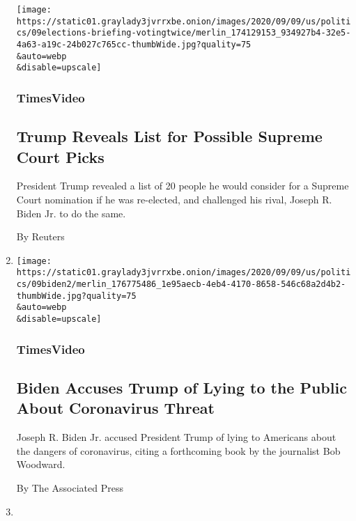 \begin{enumerate}
  \texttt{[image: https://static01.graylady3jvrrxbe.onion/images/2020/09/09/us/politics/09elections-briefing-votingtwice/merlin\_174129153\_934927b4-32e5-4a63-a19c-24b027c765cc-thumbWide.jpg?quality=75\\\&auto=webp\\\&disable=upscale]}

  \hypertarget{timesvideo}{%
  \subsubsection{TimesVideo}\label{timesvideo}}

  \hypertarget{trump-reveals-list-for-possible-supreme-court-picks}{%
  \subsection{Trump Reveals List for Possible Supreme Court
  Picks}\label{trump-reveals-list-for-possible-supreme-court-picks}}

  President Trump revealed a list of 20 people he would consider for a
  Supreme Court nomination if he was re-elected, and challenged his
  rival, Joseph R. Biden Jr. to do the same.

  By Reuters
\item
  \href{/video/us/politics/100000007331572/biden-trump-woodward-covid-michigan.html}{}

  \texttt{[image: https://static01.graylady3jvrrxbe.onion/images/2020/09/09/us/politics/09biden2/merlin\_176775486\_1e95aecb-4eb4-4170-8658-546c68a2d4b2-thumbWide.jpg?quality=75\\\&auto=webp\\\&disable=upscale]}

  \hypertarget{timesvideo-1}{%
  \subsubsection{TimesVideo}\label{timesvideo-1}}

  \hypertarget{biden-accuses-trump-of-lying-to-the-public-about-coronavirus-threat}{%
  \subsection{Biden Accuses Trump of Lying to the Public About
  Coronavirus
  Threat}\label{biden-accuses-trump-of-lying-to-the-public-about-coronavirus-threat}}

  Joseph R. Biden Jr. accused President Trump of lying to Americans
  about the dangers of coronavirus, citing a forthcoming book by the
  journalist Bob Woodward.

  By The Associated Press
\item
  \href{/2020/09/09/us/politics/homeland-security-russia-trump.html}{}


\end{enumerate}
